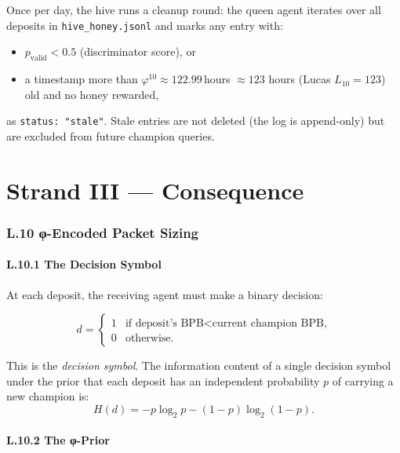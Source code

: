 Once per day, the hive runs a cleanup round: the queen agent iterates
over all deposits in \texttt{hive\_honey.jsonl} and marks any entry
with:
\begin{itemize}
\item $p_{\text{valid}} < 0.5$ (discriminator score), or
\item a timestamp more than $\varphi^{10} \approx 122.99$\,hours $\approx
  123$ hours (Lucas $L_{10} = 123$) old and no honey rewarded,
\end{itemize}
as \texttt{status: "stale"}.  Stale entries are not deleted (the log
is append-only) but are excluded from future champion queries.

\part*{Strand III — Consequence}

\section*{L.10 \quad φ-Encoded Packet Sizing}
\label{sec:appl-phi-encoding}

\subsection*{L.10.1 \quad The Decision Symbol}

At each deposit, the receiving agent must make a binary decision:

\[
  d = \begin{cases} 1 & \text{if deposit's BPB} < \text{current champion BPB,} \\
                    0 & \text{otherwise.} \end{cases}
\]

This is the \emph{decision symbol}.  The information content of a
single decision symbol under the prior that each deposit has an
independent probability $p$ of carrying a new champion is:
\[
  H(d) = -p \log_{2} p - (1-p)\log_{2}(1-p).
\]

\subsection*{L.10.2 \quad The φ-Prior}


